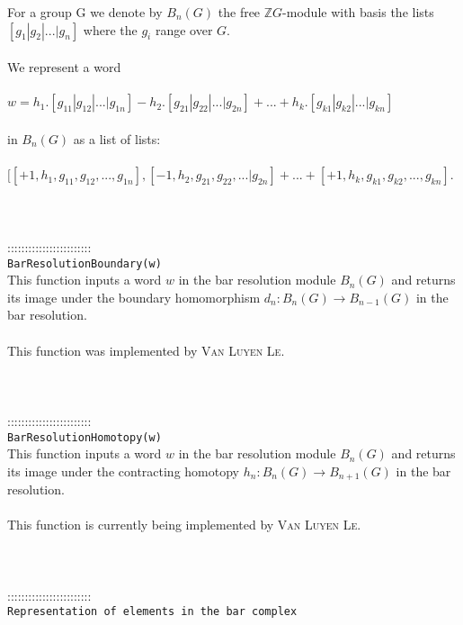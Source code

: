 \documentclass[a4paper,11pt]{report}
\begin{document}
{ For a group G we denote by $B_n(G)$ the free $\mathbb ZG$-module with basis the lists $[g_1 | g_2 | ... | g_n]$ where the $g_i$ range over $G$. \\
 \\
 We represent a word \\
 \\
 $w = h_1.[g_{11} | g_{12} | ... | g_{1n}] - h_2.[g_{21} | g_{22} | ... |
g_{2n}] + ... + h_k.[g_{k1} | g_{k2} | ... | g_{kn}] $ \\
 \\
 in $B_n(G)$ as a list of lists: \\
 \\
 $ [ [+1,h_1,g_{11} , g_{12} , ... , g_{1n}] , [-1, h_2,g_{21} , g_{22} , ... |
g_{2n}] + ... + [+1, h_k,g_{k1} , g_{k2} , ... , g_{kn}] $. \\
 \\
 \\
 \\
 ::::::::::::::::::::::::\\
 \texttt{BarResolutionBoundary(w)}\\
 

 This function inputs a word $w$ in the bar resolution module $B_n(G)$ and returns its image under the boundary homomorphism $d_n\colon B_n(G) \rightarrow B_{n-1}(G)$ in the bar resolution. \\
 \\
 This function was implemented by \textsc{Van Luyen Le}. \\
 \\
 \\
 \\
 ::::::::::::::::::::::::\\
 \texttt{BarResolutionHomotopy(w)}\\
 

 This function inputs a word $w$ in the bar resolution module $B_n(G)$ and returns its image under the contracting homotopy $h_n\colon B_n(G) \rightarrow B_{n+1}(G)$ in the bar resolution. \\
 \\
 This function is currently being implemented by \textsc{Van Luyen Le}. \\
 \\
 \\
 \\
 ::::::::::::::::::::::::\\
 \texttt{Representation of elements in the bar complex}\\
 

}
\end{document}
